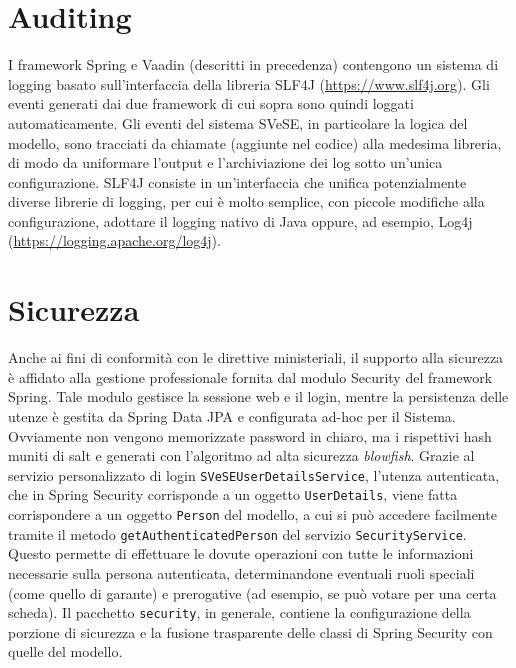 \section{Auditing}\label{logging}
I framework Spring e Vaadin (descritti in precedenza) contengono un sistema di logging basato sull'interfaccia della libreria SLF4J (\url{https://www.slf4j.org}). Gli eventi generati dai due framework di cui sopra sono quindi loggati automaticamente. Gli eventi del sistema SVeSE, in particolare la logica del modello, sono tracciati da chiamate (aggiunte nel codice) alla medesima libreria, di modo da uniformare l'output e l'archiviazione dei log sotto un'unica configurazione. SLF4J consiste in un'interfaccia che unifica potenzialmente diverse librerie di logging, per cui è molto semplice, con piccole modifiche alla configurazione, adottare il logging nativo di Java oppure, ad esempio, Log4j (\url{https://logging.apache.org/log4j}).




\section{Sicurezza}\label{security}
Anche ai fini di conformità con le direttive ministeriali, il supporto alla sicurezza è affidato alla gestione professionale fornita dal modulo Security del framework Spring. Tale modulo gestisce la sessione web e il login, mentre la persistenza delle utenze è gestita da Spring Data JPA e configurata ad-hoc per il Sistema. Ovviamente non vengono memorizzate password in chiaro, ma i rispettivi hash muniti di salt e generati con l'algoritmo ad alta sicurezza \emph{blowfish}. Grazie al servizio personalizzato di login \verb!SVeSEUserDetailsService!, l'utenza autenticata, che in Spring Security corrisponde a un oggetto \verb!UserDetails!, viene fatta corrispondere a un oggetto \verb!Person! del modello, a cui si può accedere facilmente tramite il metodo \verb!getAuthenticatedPerson! del servizio \verb!SecurityService!. Questo permette di effettuare le dovute operazioni con tutte le informazioni necessarie sulla persona autenticata, determinandone eventuali ruoli speciali (come quello di garante) e prerogative (ad esempio, se può votare per una certa scheda). Il pacchetto \verb!security!, in generale, contiene la configurazione della porzione di sicurezza e la fusione trasparente delle classi di Spring Security con quelle del modello.
